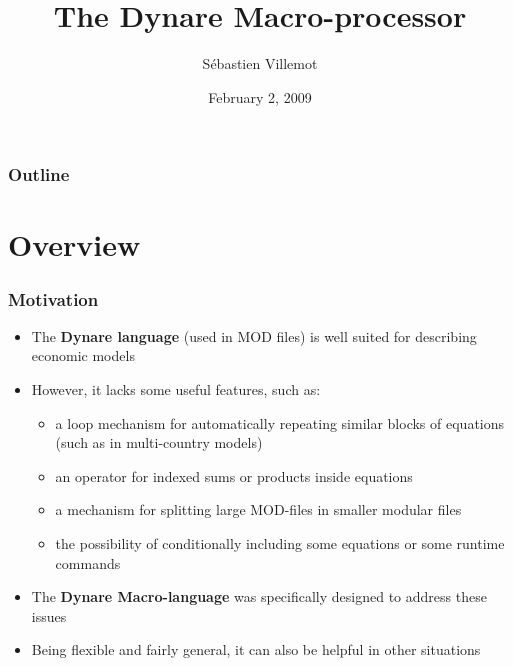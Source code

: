 \documentclass{beamer}
\title{The Dynare Macro-processor}
\author{Sébastien Villemot}
\institute[BoFrance - PSE]{Bank of France - Paris School of Economics}
\date{February 2, 2009}
\begin{document}
\begin{frame}
  \titlepage
\end{frame}


\begin{frame}
  \frametitle{Outline}
  \tableofcontents
\end{frame}

\section{Overview}

\begin{frame}
  \frametitle{Motivation}
  \begin{itemize}
  \item The \textbf{Dynare language} (used in MOD files) is well suited for describing economic models
  \item However, it lacks some useful features, such as:
    \begin{itemize}
    \item a loop mechanism for automatically repeating similar blocks of equations (such as in multi-country models)
    \item an operator for indexed sums or products inside equations
    \item a mechanism for splitting large MOD-files in smaller modular files
    \item the possibility of conditionally including some equations or some runtime commands
  \end{itemize}
  \item The \textbf{Dynare Macro-language} was specifically designed to address these issues
  \item Being flexible and fairly general, it can also be helpful in other situations
  \end{itemize}
\end{frame}
\end{document}
